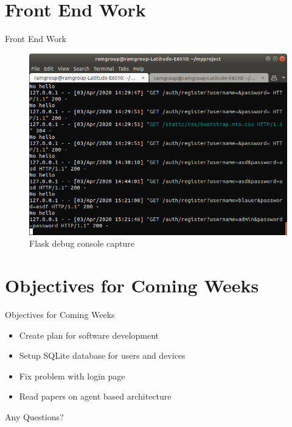 \documentclass{beamer}
\begin{document}
\section{Front End Work}
\begin{frame}{Front End Work}{}
\begin{figure}
\includegraphics[scale=0.35]{figs/img/noPost}
\caption{Flask debug console capture}
\end{figure}
\end{frame}

\section{Objectives for Coming Weeks}
\begin{frame}{Objectives for Coming Weeks}{}
\begin{itemize}
\item Create plan for software development
\item Setup SQLite database for users and devices
\item Fix problem with login page
\item Read papers on agent based architecture
\end{itemize}
\end{frame}

\begin{frame}
\center
\Huge
Any Questions?
\end{frame}
\end{document}
